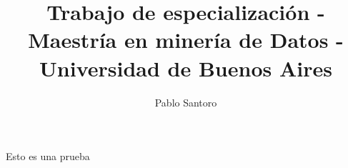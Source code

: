 \documentclass[a4paper, twopager]{article}
\author{Pablo Santoro}
\title{Trabajo de especialización - Maestría en minería de Datos - Universidad de Buenos Aires}
\begin{document}
Esto es una prueba
\end{document}

